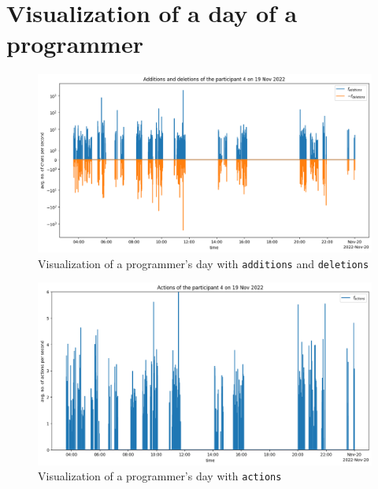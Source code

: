 \section{Visualization of a day of a programmer}

\begin{figure}[htbp]
  \centering
  \includegraphics[scale=0.5]{chapters/results/graphics/add-and-del-vis.png}
  \caption{Visualization of a programmer's day with \texttt{additions} and \texttt{deletions}}
  \label{fig:add_and_del_vis}
\end{figure}

\begin{figure}[htbp]
  \centering
  \includegraphics[scale=0.5]{chapters/results/graphics/actions-vis.png}
  \caption{Visualization of a programmer's day with \texttt{actions}}
  \label{fig:actions_vis}
\end{figure}
